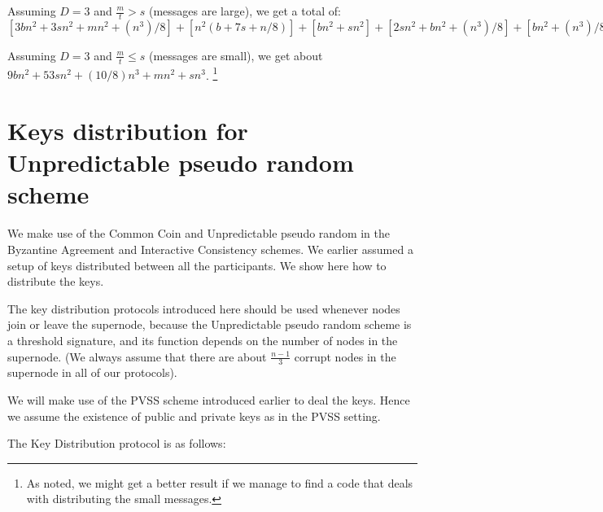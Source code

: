 \begin{enumerate}
\begin{enumerate}
\begin{enumerate}
    \end{enumerate}
  \end{enumerate}
  Assuming $D=3$ and $\frac{m}{t} > s$ (messages are large), we get a total of:
  $[3bn^2 + 3sn^2 + mn^2 + (n^3)/8] + [{n^2}(b + 7s + n/8)] + [bn^2 + sn^2] +
  [2sn^2 + bn^2 + (n^3)/8] + [bn^2 + (n^3)/8] + [bn^2 + sn^2] + [bn^2 + 2sn^2 +
  (n^3)/8] + [8bn^2 + 34sn^2 + (7/8)n^3] + [bn^2 + 3sn^3] + [bn^2 + (mn^3)/t] =
  [{bn^2}(3 + 1 + 1 + 1 + 1 + 1 + 1) + {sn^2}(3 + 7 + 1 + 2 + 1 + 2 + 34 + 3) +
    {(n^3)/8}(1 + 1 + 1 + 7) + mn^2 + (mn^3)/t \approx 9bn^2 + 53sn^2 +
    (10/8){n^3} + mn^2 + 3(mn^2) = 9bn^2 + 53sn^2 + (10/8){n^3} + 4mn^2$

  Assuming $D=3$ and $\frac{m}{t} \leq s$ (messages are small), we get about
  $9bn^2 + 53sn^2 + (10/8){n^3} + mn^2 + sn^3$. \footnote{As noted, we might get
    a better result if we manage to find a code that deals with distributing the
    small messages.}
\end{enumerate}

\section{Keys distribution for Unpredictable pseudo random scheme}

We make use of the Common Coin and Unpredictable pseudo random in the Byzantine
Agreement and Interactive Consistency schemes. We earlier assumed a setup of
keys distributed between all the participants. We show here how to distribute
the keys.

The key distribution protocols introduced here should be used whenever nodes
join or leave the supernode, because the Unpredictable pseudo random scheme is
a threshold signature, and its function depends on the number of nodes in the
supernode. (We always assume that there are about $\frac{n-1}{3}$ corrupt nodes
in the supernode in all of our protocols).

We will make use of the PVSS scheme introduced earlier to deal the keys. Hence
we assume the existence of public and private keys as in the PVSS setting.

The Key Distribution protocol is as follows:

